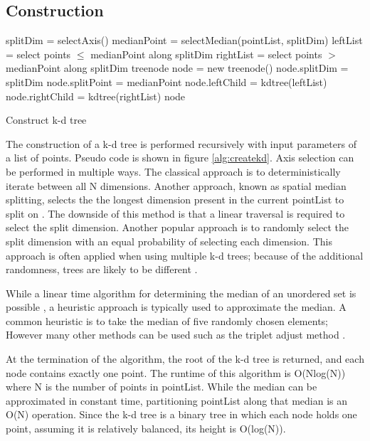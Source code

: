 \subsection{Construction}
\label{subsec:const}

\begin{algorithm}
\begin{algorithmic}
	\State splitDim = selectAxis()
	\State
	\State medianPoint = selectMedian(pointList, splitDim)
	\State leftList = select points $\leq$ medianPoint along splitDim
	\State rightList = select points $>$ medianPoint along splitDim
	\State
	\State treenode node = new treenode()
	\State node.splitDim = splitDim
	\State node.splitPoint = medianPoint
	\State node.leftChild = kdtree(leftList)
	\State node.rightChild = kdtree(rightList)
	\State
	\State \Return node
\EndFunction
\end{algorithmic}
\caption{Construct k-d tree}
\label{alg:createkd}
\end{algorithm}

The construction of a k-d tree is performed recursively with input parameters of a list of points.  Pseudo code is shown in figure \ref{alg:createkd}.  Axis selection can be performed in multiple ways.  The classical approach is to deterministically iterate between all N dimensions.  Another approach, known as spatial median splitting, selects the the longest dimension present in the current pointList to split on \citep{zhou2008real}.  The downside of this method is that a linear traversal is required to select the split dimension.  Another popular approach is to randomly select the split dimension with an equal probability of selecting each dimension.  This approach is often applied when using multiple k-d trees; because of the additional randomness, trees are likely to be different \citep{flann_pami_2014}.

While a linear time algorithm for determining the median of an unordered set is possible \citep{megiddo1984linear}, a heuristic approach is typically used to approximate the median.  A common heuristic is to take the median of five randomly chosen elements; However many other methods can be used such as the triplet adjust method \citep{battiato2000efficient}.

At the termination of the algorithm, the root of the k-d tree is returned, and each node contains exactly one point.  The runtime of this algorithm is O(Nlog(N)) where N is the number of points in pointList.  While the median can be approximated in constant time, partitioning pointList along that median is an O(N) operation.  Since the k-d tree is a binary tree in which each node holds one point, assuming it is relatively balanced, its height is O(log(N)).

